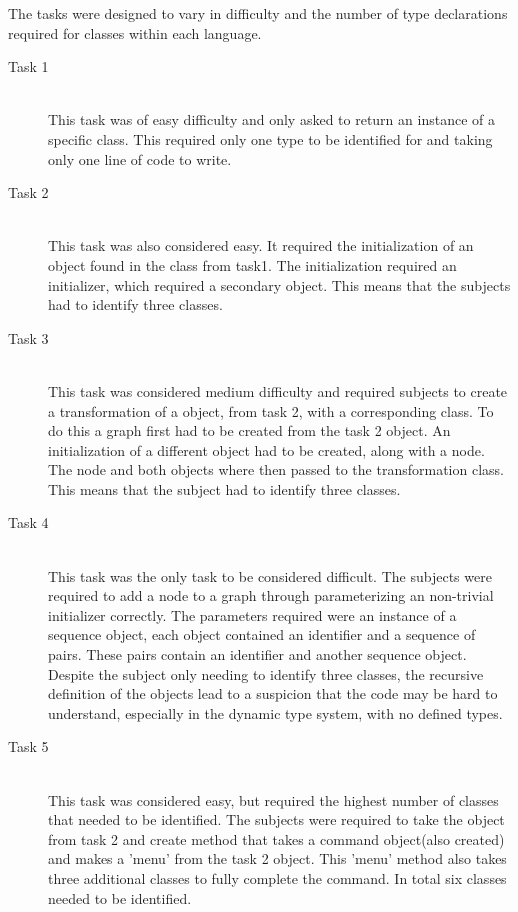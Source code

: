 \documentclass{sig-alternate}
\begin{document}
The tasks were designed to vary in difficulty and the number of type declarations required for classes within each language.
\begin{description}
\item[Task 1]\hfill \\ 
This task was of easy difficulty and only asked to return an instance of a specific class. This required only one type to be identified for and taking only one line of code to write.
\item[Task 2]\hfill \\ 
This task was also considered easy. It required the initialization of an object found in the class from task1. The initialization required an initializer, which required  a secondary object. This means that the subjects had to identify three classes.
\item[Task 3]\hfill \\
This task was considered medium difficulty and required subjects to create a transformation of a object, from task 2, with a corresponding class. To do this a graph first had to be created from the task 2 object. An initialization of a different object had to be created, along with a node. The node and both objects where then passed to the transformation class. This means that the subject had to identify three classes. 
\item[Task 4]\hfill \\
This task was the only task to be considered difficult. The subjects were required to add a node to a graph through parameterizing an non-trivial initializer correctly. The parameters required were an instance of a sequence object, each object contained an identifier and a sequence of pairs. These pairs contain an identifier and another sequence object. Despite the subject only needing to identify three classes, the recursive definition of the objects lead to a suspicion that the code may be hard to understand, especially in the dynamic type system, with no defined types. 
\item[Task 5]\hfill \\
This task was considered easy, but required the highest number of classes that needed to be identified. The subjects were required to take the object from task 2 and create method that takes a command object(also created) and makes a 'menu' from the task 2 object. This 'menu' method also takes three additional classes to fully complete the command. In total six classes needed to be identified.
\end{description} 
\end{document}
